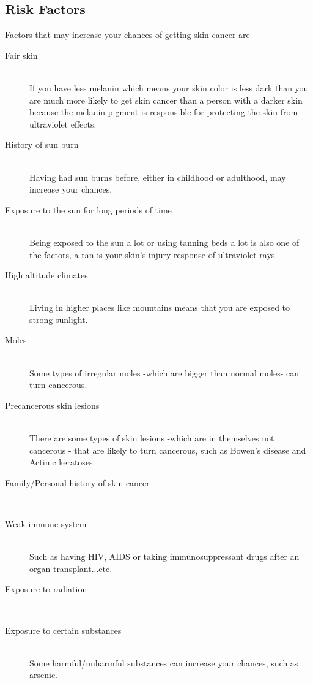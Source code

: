     \subsection{Risk Factors}
        Factors that may increase your chances of getting skin cancer are ~\cite{mayo2020}
        \begin{description}
        \item[Fair skin] \hfill \\
            If you have less melanin which means your skin color is less dark than you are much more likely to get skin cancer than a person with a darker skin because the melanin pigment is responsible for protecting the skin from ultraviolet effects.
        \item[History of sun burn] \hfill \\
            Having had sun burns before, either in childhood or adulthood, may increase your chances.
        \item[Exposure to the sun for long periods of time] \hfill \\
            Being exposed to the sun a lot or using tanning beds a lot is also one of the factors, a tan is your skin's injury response of ultraviolet rays. 
        \item[High altitude climates] \hfill \\
            Living in higher places like mountains means that you are exposed to strong sunlight.
        \item[Moles] \hfill \\
            Some types of irregular moles -which are bigger than normal moles- can turn cancerous.
        \item[Precancerous skin lesions] \hfill \\
            There are some types of skin lesions -which are in themselves not cancerous - that are likely to turn cancerous, such as Bowen's disease and  Actinic keratoses.
        \item[Family/Personal history of skin cancer] \hfill \\
        \item[Weak immune system] \hfill \\
            Such as having HIV, AIDS or taking immunosuppressant drugs after an organ transplant...etc.
        \item[Exposure to radiation] \hfill \\
        \item[Exposure to certain substances] \hfill \\
            Some harmful/unharmful substances can increase your chances, such as arsenic.
        \end{description}



